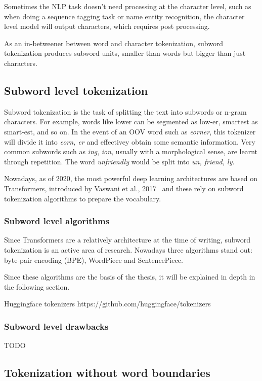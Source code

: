 Sometimes the NLP task doesn't need processing at the character level, such as when doing a sequence tagging task or name entity recognition, the character level model will output characters, which requires post processing.

As an in-betweener between word and character tokenization, subword tokenization produces subword units, smaller than words but bigger than just characters.

\subsection{Subword level tokenization}

Subword tokenization is the task of splitting the text into subwords or n-gram characters. For example, words like lower can be segmented as low-er, smartest as smart-est, and so on. In the event of an OOV word such as \emph{eorner}, this tokenizer will divide it into \emph{eorn, er} and effectivey obtain some semantic information. Very common subwords such as \emph{ing}, \emph{ion}, usually with a morphological sense, are learnt through repetition. The word \emph{unfriendly} would be split into \emph{un, friend, ly}.

Nowadays, as of 2020, the most powerful deep learning architectures are based on Transformers, introduced by Vaswani et al., 2017~\cite{vaswani2017attention} and these rely on subword tokenization algorithms to prepare the vocabulary.

\subsubsection{Subword level algorithms}

Since Transformers are a relatively architecture at the time of writing, subword tokenization is an active area of research. Nowadays three algorithms stand out: byte-pair encoding (BPE), WordPiece and SentencePiece.

Since these algorithms are the basis of the thesis, it will be explained in depth in the following section.

Huggingface tokenizers https://github.com/huggingface/tokenizers

\subsubsection{Subword level drawbacks}

TODO

\subsection{Tokenization without word boundaries}\label{subsec:wordtokwowb}

